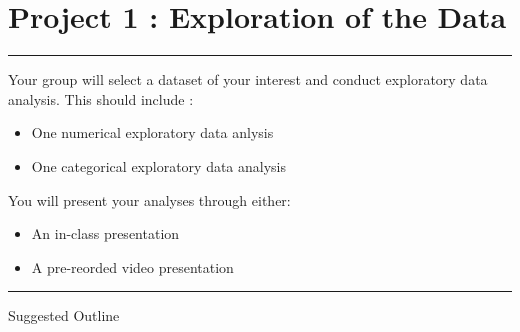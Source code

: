 \documentclass[12pt]{article}
\begin{document}
\section*{ \centering  Project 1 : Exploration of the Data}
\begin{center}\rule{16cm}{1pt}\end{center}
Your group will select a dataset of your interest and conduct exploratory data analysis.
This should include :
\begin{itemize}
    \item One numerical exploratory data anlysis
    \item One categorical exploratory data analysis 
\end{itemize} 
You will present your analyses through either:
\begin{itemize}
    \item An in-class presentation 
    \item A pre-reorded video presentation
\end{itemize}
\begin{center}\rule{16cm}{1pt}\end{center}
Suggested Outline
\end{document}
